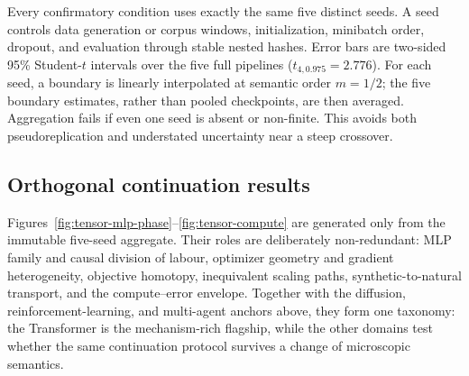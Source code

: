 Every confirmatory condition uses exactly the same five distinct seeds.  A seed
controls data generation or corpus windows, initialization, minibatch order,
dropout, and evaluation through stable nested hashes.  Error bars are two-sided
95\% Student-$t$ intervals over the five full pipelines ($t_{4,0.975}=2.776$).
For each seed, a boundary is linearly interpolated at semantic order $m=1/2$;
the five boundary estimates, rather than pooled checkpoints, are then averaged.
Aggregation fails if even one seed is absent or non-finite.  This avoids both
pseudoreplication and understated uncertainty near a steep crossover.

\subsection{Orthogonal continuation results}

Figures~\ref{fig:tensor-mlp-phase}--\ref{fig:tensor-compute} are generated only
from the immutable five-seed aggregate.  Their roles are deliberately
non-redundant: MLP family and causal division of labour, optimizer geometry and
gradient heterogeneity, objective homotopy, inequivalent scaling paths,
synthetic-to-natural transport, and the compute--error envelope.  Together with
the diffusion, reinforcement-learning, and multi-agent anchors above, they form
one taxonomy: the Transformer is the mechanism-rich flagship, while the other
domains test whether the same continuation protocol survives a change of
microscopic semantics.

